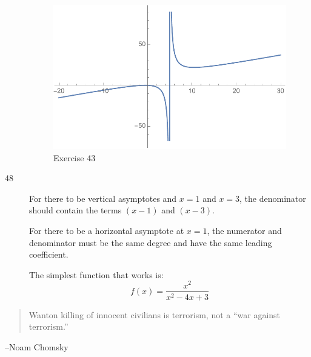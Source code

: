 \documentclass[letterpaper, landscape]{exam}
\begin{document}
\begin{description}
        \begin{figure}[H]
          \centering
          \includegraphics[scale = 0.5]{ex43.pdf}
          \caption{Exercise 43}
          \label{fig:ex43}
        \end{figure}

      \item[48] For there to be vertical asymptotes and $x = 1$ and $x = 3$, the
        denominator should contain the terms $(x - 1)$ and $(x - 3)$.

        For there to be a horizontal asymptote at $x = 1$, the numerator and denominator
        must be the same degree and have the same leading coefficient.

        The simplest function that works is:
        \[
          \boxed{ f(x) = \frac{x^2}{x^2 - 4x + 3} }
        \]
    \end{description}

  \else
    \vspace{11 cm}
    \begin{quote}
      \begin{em}
        Wanton killing of innocent civilians is terrorism, not a ``war against
        terrorism.'' 
      \end{em}
    \end{quote}
    \hspace{1 cm} --Noam Chomsky
  \fi
\end{document}
